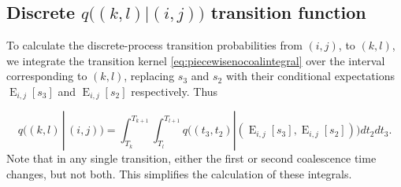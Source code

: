 \documentclass{article}
\DeclareMathOperator{\E}{E}
\begin{document}
\subsection{Discrete $q\big((k,l)|(i,j)\big)$ transition function}

To calculate the discrete-process transition probabilities from $(i,j)$, to
$(k,l)$, we integrate the transition kernel \eqref{eq:piecewisenocoalintegral}
over the interval corresponding to $(k,l)$, replacing $s_3$ and $s_2$ with
their conditional expectations $\E_{i,j}[s_3]$ and $\E_{i,j}[s_2]$
respectively. Thus


\begin{equation}
    q\Big((k,l)\,|\,(i,j)\Big) = 
    \int_{T_k}^{T_{k+1}}\int_{T_l}^{T_{l+1}}q\Big((t_3,t_2)|\left(\E_{i,j}[s_3],\E_{i,j}[s_2]\right)\Big)dt_2dt_3.
\end{equation}
Note that in any single transition, either the first or second coalescence time
changes, but not both. This simplifies the calculation of these integrals.
\end{document}
